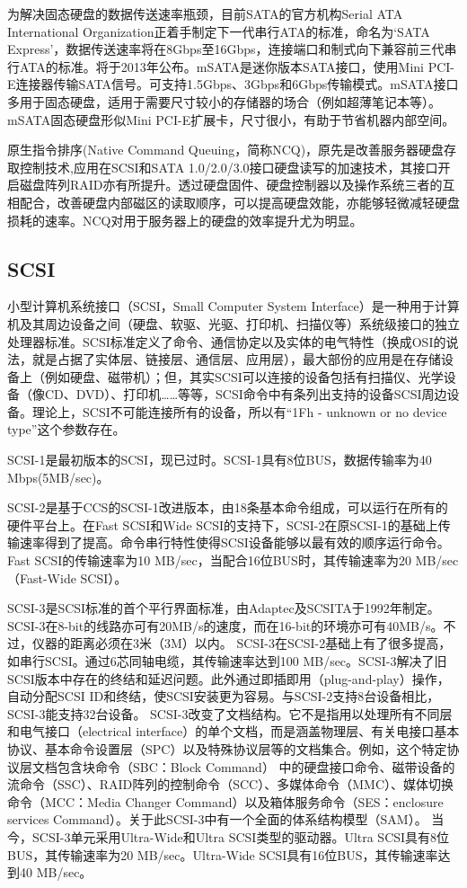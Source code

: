 为解决固态硬盘的数据传送速率瓶颈，目前SATA的官方机构Serial ATA International Organization正着手制定下一代串行ATA的标准，命名为‘SATA Express’，数据传送速率将在8Gbps至16Gbps，连接端口和制式向下兼容前三代串行ATA的标准。将于2013年公布。mSATA是迷你版本SATA接口，使用Mini PCI-E连接器传输SATA信号。可支持1.5Gbps、3Gbps和6Gbps传输模式。mSATA接口多用于固态硬盘，适用于需要尺寸较小的存储器的场合（例如超薄笔记本等）。mSATA固态硬盘形似Mini PCI-E扩展卡，尺寸很小，有助于节省机器内部空间。


原生指令排序(Native Command Queuing，简称NCQ)，原先是改善服务器硬盘存取控制技术,应用在SCSI和SATA 1.0/2.0/3.0接口硬盘读写的加速技术，其接口开启磁盘阵列RAID亦有所提升。透过硬盘固件、硬盘控制器以及操作系统三者的互相配合，改善硬盘内部磁区的读取顺序，可以提高硬盘效能，亦能够轻微减轻硬盘损耗的速率。NCQ对用于服务器上的硬盘的效率提升尤为明显。

\subsection{SCSI}
小型计算机系统接口（SCSI，Small Computer System Interface）是一种用于计算机及其周边设备之间（硬盘、软驱、光驱、打印机、扫描仪等）系统级接口的独立处理器标准。SCSI标准定义了命令、通信协定以及实体的电气特性（换成OSI的说法，就是占据了实体层、链接层、通信层、应用层），最大部份的应用是在存储设备上（例如硬盘、磁带机）；但，其实SCSI可以连接的设备包括有扫描仪、光学设备（像CD、DVD）、打印机……等等，SCSI命令中有条列出支持的设备SCSI周边设备。理论上，SCSI不可能连接所有的设备，所以有“1Fh - unknown or no device type”这个参数存在。

SCSI-1是最初版本的SCSI，现已过时。SCSI-1具有8位BUS，数据传输率为40 Mbps(5MB/sec)。

SCSI-2是基于CCS的SCSI-1改进版本，由18条基本命令组成，可以运行在所有的硬件平台上。在Fast SCSI和Wide SCSI的支持下，SCSI-2在原SCSI-1的基础上传输速率得到了提高。命令串行特性使得SCSI设备能够以最有效的顺序运行命令。Fast SCSI的传输速率为10 MB/sec，当配合16位BUS时，其传输速率为20 MB/sec（Fast-Wide SCSI）。

SCSI-3是SCSI标准的首个平行界面标准，由Adaptec及SCSITA于1992年制定。SCSI-3在8-bit的线路亦可有20MB/s的速度，而在16-bit的环境亦可有40MB/s。不过，仪器的距离必须在3米（3M）以内。 SCSI-3在SCSI-2基础上有了很多提高，如串行SCSI。通过6芯同轴电缆，其传输速率达到100 MB/sec。SCSI-3解决了旧SCSI版本中存在的终结和延迟问题。此外通过即插即用（plug-and-play）操作，自动分配SCSI ID和终结，使SCSI安装更为容易。与SCSI-2支持8台设备相比，SCSI-3能支持32台设备。 SCSI-3改变了文档结构。它不是指用以处理所有不同层和电气接口（electrical interface）的单个文档，而是涵盖物理层、有关电接口基本协议、基本命令设置层（SPC）以及特殊协议层等的文档集合。例如，这个特定协议层文档包含块命令（SBC：Block Command） 中的硬盘接口命令、磁带设备的流命令（SSC）、RAID阵列的控制命令（SCC）、多媒体命令（MMC）、媒体切换命令（MCC：Media Changer Command）以及箱体服务命令（SES：enclosure services Command）。关于此SCSI-3中有一个全面的体系结构模型（SAM）。 当今，SCSI-3单元采用Ultra-Wide和Ultra SCSI类型的驱动器。Ultra SCSI具有8位BUS，其传输速率为20 MB/sec。Ultra-Wide SCSI具有16位BUS，其传输速率达到40 MB/sec。

